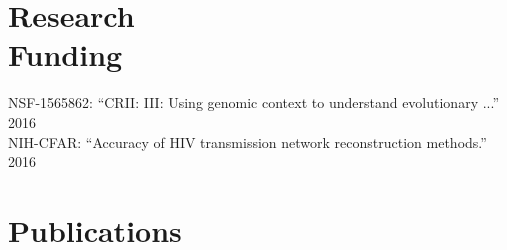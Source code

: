 \documentclass[margin,line,letterpaper]{resume}
\begin{document}
\begin{resume}
    
    
    \section{\mysidestyle Research\\Funding}
 NSF-1565862:  ``CRII: III: Using genomic context to understand evolutionary ...''
 \hfill 2016\\
 NIH-CFAR:  ``Accuracy of HIV transmission network reconstruction methods.''
 \hfill 2016
\clearpage

    \renewcommand*{\thefootnote}{\fnsymbol{footnote}}
    \section{\mysidestyle Publications}

\newcommand\blfootnote[1]{%
  \begingroup
  \renewcommand\thefootnote{}\footnote{#1}%
  \addtocounter{footnote}{-1}%
  \endgroup
}
    
\def\FormatName#1{%
  \def\myname{Siavash Mirarab}
  \def\mynamee{Siavash Mirarab*}%
  \edef\name{#1}%
  \ifx\name\myname
    \textbf{#1}%
  \else
    \ifx\name\mynamee
       \textbf{Siavash Mirarab}\footnote[1]{co-first author}%
    \else
      #1%
    \fi
  \fi
}

\vspace{-2pt}
\begin{spacing}{1.2}

\end{spacing}

\vspace{-10pt}


\end{resume}
\end{document}
